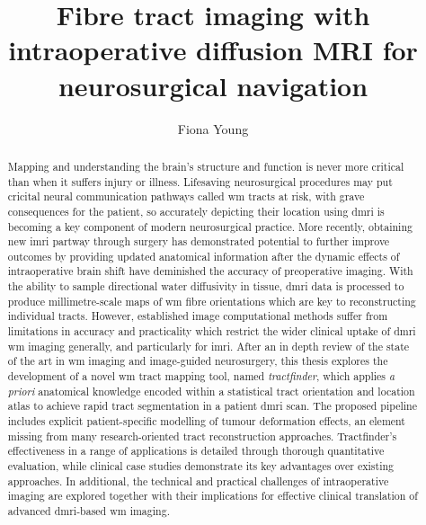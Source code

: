 
\title{ Fibre tract imaging with intraoperative diffusion MRI for neurosurgical navigation }
\author{ Fiona Young }

\maketitle
\makedeclaration

\begin{abstract} %
Mapping and understanding the brain's structure and function is never more critical than when it suffers injury or illness.
Lifesaving neurosurgical procedures may put cricital neural communication pathways called \gls{wm} tracts at risk, with grave consequences for the patient, so accurately depicting their location using \gls{dmri} is becoming a key component of modern neurosurgical practice.
More recently, obtaining new \gls{imri} partway through surgery has demonstrated potential to further improve outcomes by providing updated anatomical information after the dynamic effects of intraoperative brain shift have deminished the accuracy of preoperative imaging.
With the ability to sample directional water diffusivity in tissue, \gls{dmri} data is processed to produce millimetre-scale maps of \gls{wm} fibre orientations which are key to reconstructing individual tracts.
However, established image computational methods suffer from limitations in accuracy and practicality which restrict the wider clinical uptake of \gls{dmri} \gls{wm} imaging generally, and particularly for \gls{imri}.
After an in depth review of the state of the art in \gls{wm} imaging and image-guided neurosurgery, this thesis explores the development of a novel \gls{wm} tract mapping tool, named \textit{tractfinder}, which applies \textit{a priori} anatomical knowledge encoded within a statistical tract orientation and location atlas to achieve rapid tract segmentation in a patient \gls{dmri} scan.
The proposed pipeline includes explicit patient-specific modelling of tumour deformation effects, an element missing from many research-oriented tract reconstruction approaches.
Tractfinder's effectiveness in a range of applications is detailed through thorough quantitative evaluation, while clinical case studies demonstrate its key advantages over existing approaches.
In additional, the technical and practical challenges of intraoperative imaging are explored together with their implications for effective clinical translation of advanced \gls{dmri}-based \gls{wm} imaging.
\end{abstract}

